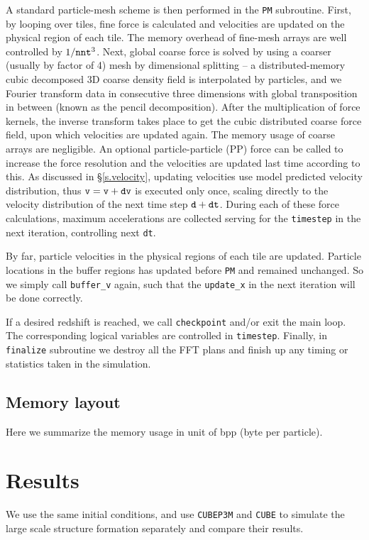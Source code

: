 \documentclass[10pt,twocolumn,preprint]{emulateapj}
\begin{document}
A standard particle-mesh scheme is then performed in the {\tt PM} subroutine. First, by looping over tiles, fine force is calculated and velocities are updated on the physical region of each tile. The memory overhead of fine-mesh arrays are well controlled by $1/{\tt nnt}^3$. Next, global coarse force is solved by using a coarser (usually by factor of 4) mesh by dimensional splitting -- a distributed-memory cubic decomposed 3D coarse density field is interpolated by particles, and we Fourier transform data in consecutive three dimensions with global transposition in between (known as the pencil decomposition). After the multiplication of force kernels, the inverse transform takes place to get the cubic distributed coarse force field, upon which velocities are updated again. The memory usage of coarse arrays are negligible. An optional particle-particle (PP) force can be called to increase the force resolution and the velocities are updated last time according to this. As discussed in \S\ref{s.velocity}, updating velocities use model predicted velocity distribution, thus ${\tt v}={\tt v}+{\tt dv}$ is executed only once, scaling directly to the velocity distribution of the next time step ${\tt d}+{\tt dt}$. During each of these force calculations, maximum accelerations are collected serving for the {\tt timestep} in the next iteration, controlling next {\tt dt}.

By far, particle velocities in the physical regions of each tile are updated. Particle locations in the buffer regions has updated before {\tt PM} and remained unchanged. So we simply call {\tt buffer\_v} again, such that the {\tt update\_x} in the next iteration will be done correctly.

If a desired redshift is reached, we call {\tt checkpoint} and/or exit the main loop. The corresponding logical variables are controlled in {\tt timestep}. Finally, in {\tt finalize} subroutine we destroy all the FFT plans and finish up any timing or statistics taken in the simulation.


\subsection{Memory layout}
Here we summarize the memory usage in unit of bpp (byte per particle).

\section{Results}
We use the same initial conditions, and use {\tt CUBEP3M} and {\tt CUBE} to simulate the large scale structure formation separately and compare their results.
\end{document}
